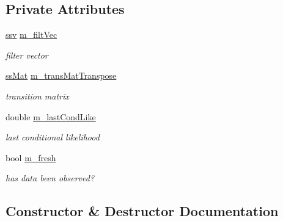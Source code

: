\subsection*{Private Attributes}
\begin{DoxyCompactItemize}
\item 
\hyperlink{classpf_1_1cf__filter_a448f675e130ac4b340e2c3e545673d0d}{ssv} \hyperlink{classpf_1_1hmm_af3e6a0ffd2a9073d07b1b4bba3437d6a}{m\+\_\+filt\+Vec}\hypertarget{classpf_1_1hmm_af3e6a0ffd2a9073d07b1b4bba3437d6a}{}\label{classpf_1_1hmm_af3e6a0ffd2a9073d07b1b4bba3437d6a}

\begin{DoxyCompactList}\small\item\em filter vector \end{DoxyCompactList}\item 
\hyperlink{classpf_1_1hmm_aa6e481316a30758d0eae33dbc8b5e8b5}{ss\+Mat} \hyperlink{classpf_1_1hmm_a7f8d3cc9e3464a32e3e989a844a09012}{m\+\_\+trans\+Mat\+Transpose}\hypertarget{classpf_1_1hmm_a7f8d3cc9e3464a32e3e989a844a09012}{}\label{classpf_1_1hmm_a7f8d3cc9e3464a32e3e989a844a09012}

\begin{DoxyCompactList}\small\item\em transition matrix \end{DoxyCompactList}\item 
double \hyperlink{classpf_1_1hmm_adb7281566c6e48ec1691a0b8b13b385a}{m\+\_\+last\+Cond\+Like}\hypertarget{classpf_1_1hmm_adb7281566c6e48ec1691a0b8b13b385a}{}\label{classpf_1_1hmm_adb7281566c6e48ec1691a0b8b13b385a}

\begin{DoxyCompactList}\small\item\em last conditional likelihood \end{DoxyCompactList}\item 
bool \hyperlink{classpf_1_1hmm_a2923531a766aa61f30078fba49caf6b7}{m\+\_\+fresh}\hypertarget{classpf_1_1hmm_a2923531a766aa61f30078fba49caf6b7}{}\label{classpf_1_1hmm_a2923531a766aa61f30078fba49caf6b7}

\begin{DoxyCompactList}\small\item\em has data been observed? \end{DoxyCompactList}\end{DoxyCompactItemize}


\subsection{Constructor \& Destructor Documentation}
